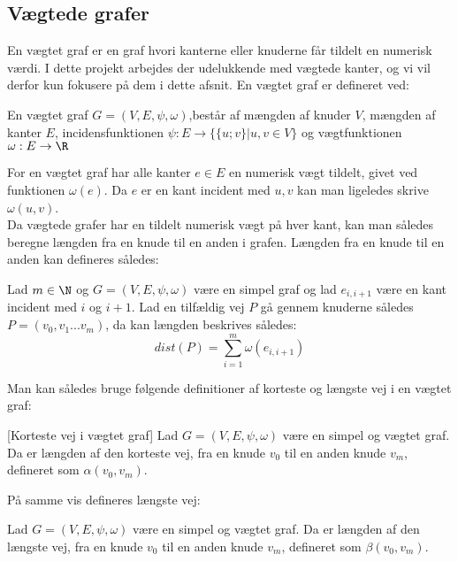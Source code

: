 \subsection{Vægtede grafer}
En vægtet graf er en graf hvori kanterne eller knuderne får tildelt en numerisk værdi. I dette projekt arbejdes der udelukkende med vægtede kanter, og vi vil derfor kun fokusere på dem i dette afsnit.
En vægtet graf er defineret ved:
\begin{defn}
En vægtet graf $G=(V,E,\psi,\omega)$,består af mængden af knuder $V$, mængden af kanter $E$, incidensfunktionen $\psi: E \rightarrow \{\{u;v\}|u,v \in V\}$ og vægtfunktionen $\omega: E \rightarrow \R$
\end{defn}
For en vægtet graf har alle kanter $e\in E$ en numerisk vægt tildelt, givet ved funktionen $\omega (e)$. Da $e$ er en kant incident med ${u,v}$ kan man  ligeledes skrive $\omega (u,v)$.
\\ Da vægtede grafer har en tildelt numerisk vægt på hver kant, kan man således beregne længden fra en knude til en anden i grafen. Længden fra en knude til en anden kan defineres således:
\begin{defn}
Lad $m\in \N$ og $G=(V,E,\psi,\omega)$ være en simpel graf og lad $e_{i,i+1}$ være en kant incident med $i$ og $i+1$. Lad en tilfældig vej $P$ gå gennem knuderne således $P=(v_0,v_1...v_m)$, da kan længden beskrives således:
	\begin{equation*}
	dist(P)=\sum_{i=1}^{m}\omega(e_{i,i+1})
	\end{equation*}  
\end{defn}
Man kan således bruge følgende definitioner af korteste og længste vej i en vægtet graf:


\begin{defn} \label{defn:min.vej} [Korteste vej i vægtet graf]
Lad $G=(V,E,\psi,\omega)$ være en simpel og vægtet graf. Da er længden af den korteste vej, fra en knude $v_0$ til en anden knude $v_m$, defineret som $\alpha(v_0,v_m)$.
\end{defn}

På samme vis defineres længste vej:

\begin{defn} 
Lad $G=(V,E,\psi,\omega)$ være en simpel og vægtet graf. Da er længden af den længste vej, fra en knude $v_0$ til en anden knude $v_m$, defineret som $\beta(v_0,v_m)$.
\end{defn}
